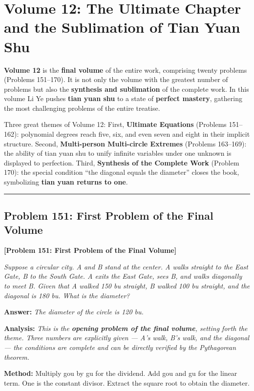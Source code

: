 \documentclass[11pt,a4paper]{book}
\newcommand{\answer}[1]{\noindent\textbf{\color{anacolor}Answer: }\textit{#1}\par}
\newcommand{\method}[1]{\noindent\textbf{\color{methodcolor}Method: }#1\par}
\newcommand{\analysis}[1]{\noindent\textbf{\color{anacolor}Analysis: }\textit{#1}\par}
\newcommand{\longline}{\noindent\rule{\textwidth}{0.4pt}}
\begin{document}
\newpage

\chapter{Volume 12: The Ultimate Chapter and the Sublimation of Tian Yuan Shu}
\label{ch:vol12}

\textbf{Volume 12} is the \textbf{final volume} of the entire work, comprising twenty problems (Problems 151--170). It is not only the volume with the greatest number of problems but also the \textbf{synthesis and sublimation} of the complete work. In this volume Li Ye pushes \textbf{tian yuan shu} to a state of \textbf{perfect mastery}, gathering the most challenging problems of the entire treatise.

Three great themes of Volume 12: First, \textbf{Ultimate Equations} (Problems 151--162): polynomial degrees reach five, six, and even seven and eight in their implicit structure. Second, \textbf{Multi-person Multi-circle Extremes} (Problems 163--169): the ability of tian yuan shu to unify infinite variables under one unknown is displayed to perfection. Third, \textbf{Synthesis of the Complete Work} (Problem 170): the special condition ``the diagonal equals the diameter'' closes the book, symbolizing \textbf{tian yuan returns to one}.

\longline

\section{Problem 151: First Problem of the Final Volume}
\label{sec:prob151}

\noindent\textbf{\color{probcolor}[Problem 151: First Problem of the Final Volume]}

\textit{Suppose a circular city. A and B stand at the center. A walks straight to the East Gate, B to the South Gate. A exits the East Gate, sees B, and walks diagonally to meet B. Given that A walked 150 bu straight, B walked 100 bu straight, and the diagonal is 180 bu. What is the diameter?}

\answer{The diameter of the circle is 120 bu.}

\analysis{This is the \textbf{opening problem of the final volume}, setting forth the theme. Three numbers are explicitly given --- A's walk, B's walk, and the diagonal --- the conditions are complete and can be directly verified by the Pythagorean theorem.}

\method{Multiply gou by gu for the dividend. Add gou and gu for the linear term. One is the constant divisor. Extract the square root to obtain the diameter.}
\end{document}
